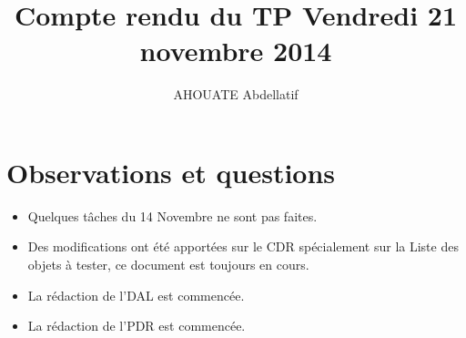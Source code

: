\documentclass{../../../../../res/rapport}
\author{AHOUATE Abdellatif}
\title{Compte rendu du TP Vendredi 21 novembre 2014}
\begin{document}
    \maketitle
    \tableofcontents
    \clearpage
    
    \section{Observations et questions} 
    \label{sec:observations_et_questions}
        \begin{itemize}
            
            \item Quelques tâches du 14 Novembre ne sont pas faites.\\
            \item Des modifications ont été apportées sur le CDR spécialement sur la Liste des objets à tester, ce document est toujours en cours.\\
            \item La rédaction de l'DAL est commencée.\\
            \item La rédaction de l'PDR est commencée.\\
            	 
        \end{itemize}
        
\end{document}

